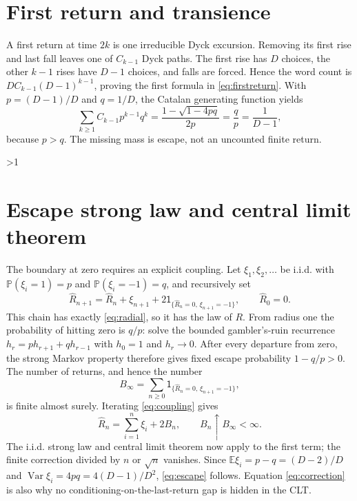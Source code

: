 \documentclass[10pt]{article}
\providecommand{\CRevisionRound}{2}
\theoremstyle{remark}
\newcommand{\E}{\mathbb E}
\newcommand{\Pp}{\mathbb P}
\newcommand{\1}{\mathsf{1}}
\begin{document}
\section{First return and transience}

A first return at time $2k$ is one irreducible Dyck excursion.  Removing its
first rise and last fall leaves one of $C_{k-1}$ Dyck paths.  The first rise
has $D$ choices, the other $k-1$ rises have $D-1$ choices, and falls are
forced.  Hence the word count is $DC_{k-1}(D-1)^{k-1}$, proving the first
formula in \eqref{eq:firstreturn}.  With $p=(D-1)/D$ and $q=1/D$, the Catalan
generating function
yields
\[
 \sum_{k\ge1}C_{k-1}p^{k-1}q^k
 =\frac{1-\sqrt{1-4pq}}{2p}=\frac qp=\frac1{D-1},
\]
because $p>q$.  The missing mass is escape, not an uncounted finite return.
\fi

\ifnum\CRevisionRound>1
\section{Escape strong law and central limit theorem}

The boundary at zero requires an explicit coupling.  Let
$\xi_1,\xi_2,\ldots$ be i.i.d. with
$\Pp(\xi_i=1)=p$ and $\Pp(\xi_i=-1)=q$, and recursively set
\begin{equation}
 \widehat R_{n+1}=\widehat R_n+\xi_{n+1}
 +2\1_{\{\widehat R_n=0,\,\xi_{n+1}=-1\}},\qquad \widehat R_0=0.
                                                               \label{eq:coupling}
\end{equation}
This chain has exactly \eqref{eq:radial}, so it has the law of $R$.  From radius one the
probability of hitting zero is $q/p$: solve the bounded gambler's-ruin
recurrence $h_r=ph_{r+1}+qh_{r-1}$ with $h_0=1$ and $h_r\to0$.  After every
departure from zero, the strong Markov property therefore gives fixed escape
probability $1-q/p>0$.  The number of returns, and hence the number
\[
 B_\infty=\sum_{n\ge0}\1_{\{\widehat R_n=0,\,\xi_{n+1}=-1\}},
\]
is finite almost surely.  Iterating \eqref{eq:coupling} gives
\begin{equation}
 \widehat R_n=\sum_{i=1}^n\xi_i+2B_n,\qquad B_n\uparrow B_\infty<\infty.
                                                               \label{eq:correction}
\end{equation}
The i.i.d. strong law and central limit theorem now apply to the first term;
the finite correction divided by $n$ or $\sqrt n$ vanishes.  Since
$\E\xi_i=p-q=(D-2)/D$ and
$\operatorname{Var}\xi_i=4pq=4(D-1)/D^2$, \eqref{eq:escape} follows.
Equation \eqref{eq:correction} is
also why no conditioning-on-the-last-return gap is hidden in the CLT.
\end{document}
